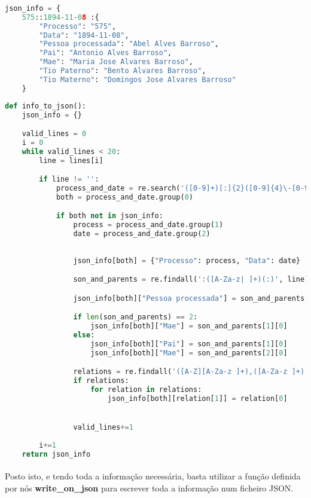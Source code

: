 \documentclass[11pt,a4paper]{report}
\begin{document}
\begin{enumerate}[label=\alph*.]
\begin{lstlisting}[language=Python, caption=Estrutura de dados alínea d]
    
json_info = { 
    575::1894-11-08 :{
        "Processo": "575",
        "Data": "1894-11-08",
        "Pessoa processada": "Abel Alves Barroso",
        "Pai": "Antonio Alves Barroso",
        "Mae": "Maria Jose Alvares Barroso",
        "Tio Paterno": "Bento Alvares Barroso",
        "Tio Materno": "Domingos Jose Alvares Barroso"
    }
        \end{lstlisting}

        \begin{lstlisting}[language=Python, caption=Função info\_to\_json]
def info_to_json():
    json_info = {}

    valid_lines = 0
    i = 0
    while valid_lines < 20:
        line = lines[i]

        if line != '':
            process_and_date = re.search('([0-9]+)[:]{2}([0-9]{4}\-[0-9]{2}\-[0-9]{2})', line)
            both = process_and_date.group(0)

            if both not in json_info:
                process = process_and_date.group(1)
                date = process_and_date.group(2)
            
            
                json_info[both] = {"Processo": process, "Data": date}

                son_and_parents = re.findall(':([A-Za-z| ]+)(:)', line)

                json_info[both]["Pessoa processada"] = son_and_parents[0][0]

                if len(son_and_parents) == 2:
                    json_info[both]["Mae"] = son_and_parents[1][0]
                else:
                    json_info[both]["Pai"] = son_and_parents[1][0]
                    json_info[both]["Mae"] = son_and_parents[2][0]

                relations = re.findall('([A-Z][A-Za-z ]+),([A-Za-z ]+). ?(?i:(Proc.[0-9]+))', line)
                if relations:
                    for relation in relations:
                        json_info[both][relation[1]] = relation[0]


                valid_lines+=1
    
        i+=1
    return json_info
        \end{lstlisting}

    \paragraph{}
    Posto isto, e tendo toda a informação necessária, basta utilizar a função definida por nós \textbf{write\_on\_json} para escrever toda a informação num ficheiro JSON.


\end{enumerate}
\end{document}

